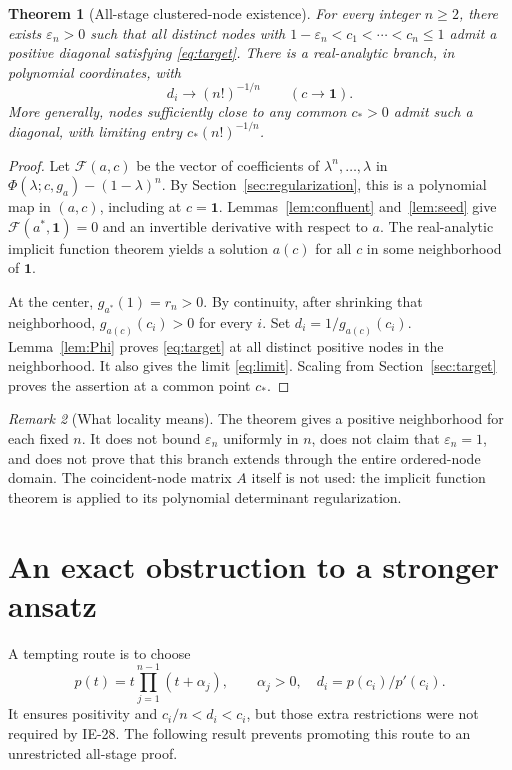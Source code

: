 \documentclass[11pt]{article}
\newtheorem{theorem}{Theorem}[section]
\theoremstyle{remark}\newtheorem{remark}[theorem]{Remark}
\newcommand{\eps}{\varepsilon}
\begin{document}
\begin{theorem}[All-stage clustered-node existence]\label{thm:local}
For every integer $n\ge2$, there exists $\eps_n>0$ such that all distinct
nodes with $1-\eps_n<c_1<\cdots<c_n\le1$ admit a positive diagonal satisfying
\eqref{eq:target}. There is a real-analytic branch, in polynomial coordinates,
with
\begin{equation}\label{eq:limit}
 d_i\longrightarrow(n!)^{-1/n}\qquad(c\longrightarrow\mathbf1).
\end{equation}
More generally, nodes sufficiently close to any common $c_*>0$ admit such a
diagonal, with limiting entry $c_*(n!)^{-1/n}$.
\end{theorem}
\begin{proof}
Let $\mathcal F(a,c)$ be the vector of coefficients of $\lambda^n,\ldots,
\lambda$ in $\Phi(\lambda;c,g_a)-(1-\lambda)^n$.
By Section~\ref{sec:regularization}, this is a polynomial map in $(a,c)$,
including at $c=\mathbf1$. Lemmas~\ref{lem:confluent} and~\ref{lem:seed} give
$\mathcal F(a^*,\mathbf1)=0$ and an invertible derivative with respect to $a$.
The real-analytic implicit function theorem yields a solution $a(c)$ for all
$c$ in some neighborhood of $\mathbf1$.

At the center, $g_{a^*}(1)=r_n>0$. By continuity, after shrinking that
neighborhood, $g_{a(c)}(c_i)>0$ for every $i$. Set $d_i=1/g_{a(c)}(c_i)$.
Lemma~\ref{lem:Phi} proves \eqref{eq:target} at all distinct positive nodes
in the neighborhood. It also gives the limit \eqref{eq:limit}. Scaling from
Section~\ref{sec:target} proves the assertion at a common point $c_*$.
\end{proof}

\begin{remark}[What locality means]
The theorem gives a positive neighborhood for each fixed $n$. It does not
bound $\eps_n$ uniformly in $n$, does not claim that $\eps_n=1$, and does not
prove that this branch extends through the entire ordered-node domain.
The coincident-node matrix $A$ itself is not used: the implicit function
theorem is applied to its polynomial determinant regularization.
\end{remark}

\section{An exact obstruction to a stronger ansatz}\label{sec:obstruction}
A tempting route is to choose
\begin{equation}\label{eq:strong}
 p(t)=t\prod_{j=1}^{n-1}(t+\alpha_j),\qquad\alpha_j>0,
 \quad d_i=p(c_i)/p'(c_i).
\end{equation}
It ensures positivity and $c_i/n<d_i<c_i$, but those extra restrictions were
not required by IE-28. The following result prevents promoting this route to
an unrestricted all-stage proof.
\end{document}
